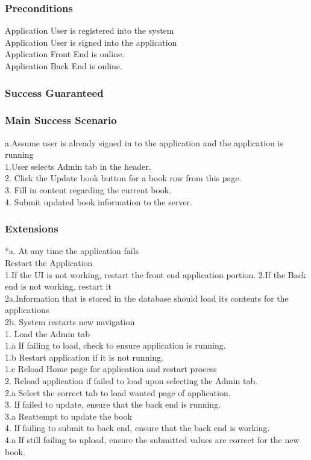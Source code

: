 \documentclass{article}
\begin{document}
	\subsubsection{\textbf{Preconditions}}
	Application User is registered into the system \\
	Application User is signed into the application \\
	Application Front End is online. \\
	Application Back End is online. \\
	
	\subsubsection{\textbf{Success Guaranteed}}
	
	\subsubsection{\textbf{Main Success Scenario}}
	a.Assume user is already signed in to the application and the application is running\\
	1.User selects Admin tab in the header. \\
	2. Click the Update book button for a book row from this page. \\
	3. Fill in content regarding the current book. \\
	4. Submit updated book information to the server. \\
	
	
	\subsubsection{\textbf{Extensions}}
	*a. At any time the application fails \\
	Restart the Application \\
	1.If the UI is not working, restart the front end application portion.
	2.If the Back end is not working, restart it \\
	2a.Information that is stored in the database should load its contents for the applications \\
	2b. System restarts new navigation \\
	1. Load the Admin tab \\
	1.a  If failing to load, check to ensure application is running. \\
	1.b Restart application if it is not running. \\
	1.c Reload Home page for application and restart process \\
	2. Reload application if failed to load upon selecting the Admin tab. \\
	2.a Select the correct tab to load wanted page of application.\\
	3. If failed to update, ensure that the back end is running. \\
	3.a Reattempt to update the book\\
	4. If failing to submit to back end, ensure that the back end is working. \\
	4.a If still failing to upload, ensure the submitted values are correct for the new book. \\
	
\end{document}
